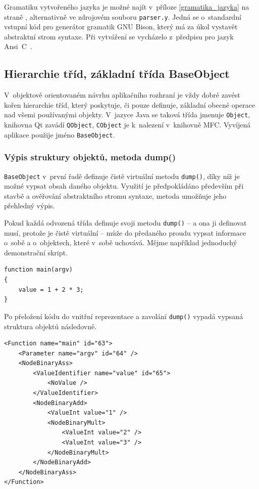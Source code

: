 \documentclass[11pt,twoside,a4paper]{book}
\begin{document}
Gramatiku vytvořeného jazyka je možné najít v~příloze \ref{gramatika_jazyka} na straně \pageref{gramatika_jazyka}, alternativně ve zdrojovém souboru \texttt{parser.y}. Jedná se o~standardní vstupní kód pro generátor gramatik GNU Bison, který má za úkol vystavět abstraktní strom syntaxe. Při vytváření se vycházelo z~předpisu pro jazyk Ansi~C~\cite{c_grammar}.


\subsection{Hierarchie tříd, základní třída BaseObject}

V~objektově orientovaném návrhu aplikačního rozhraní je vždy dobré zavést kořen hierarchie tříd, který poskytuje, či pouze definuje, základní obecné operace nad všemi používanými objekty. V~jazyce Java se taková třída jmenuje \texttt{Object}, knihovna Qt zavádí \texttt{QObject}, \texttt{CObject} je k~nalezení v~knihovně MFC. Vyvíjená aplikace použije jméno \texttt{Ba\-se\-Ob\-ject}.


\subsubsection{Výpis struktury objektů, metoda dump()}

\texttt{BaseObject} v~první řadě definuje čistě virtuální metodu \texttt{dump()}, díky níž je možné vypsat obsah daného objektu. Využití je předpokládáno především při stavbě a ověřování abstraktního stromu syntaxe, metoda umožňuje jeho přehledný výpis.

Pokud každá odvozená třída definuje svoji metodu \texttt{dump()} -- a ona ji definovat musí, protože je čistě virtuální -- může do předaného proudu vypsat informace o~sobě a o~objektech, které v~sobě uchovává. Mějme na\-pří\-klad jednoduchý demonstrační skript.

\begin{verbatim}
function main(argv)
{
    value = 1 + 2 * 3;
}
\end{verbatim}

Po přeložení kódu do vnitřní reprezentace a zavolání \texttt{dump()} vypadá vypsaná struktura objektů následovně.

\begin{verbatim}
<Function name="main" id="63">
    <Parameter name="argv" id="64" />
    <NodeBinaryAss>
        <ValueIdentifier name="value" id="65">
            <NoValue />
        </ValueIdentifier>
        <NodeBinaryAdd>
            <ValueInt value="1" />
            <NodeBinaryMult>
                <ValueInt value="2" />
                <ValueInt value="3" />
            </NodeBinaryMult>
        </NodeBinaryAdd>
    </NodeBinaryAss>
</Function>
\end{verbatim}
\end{document}
